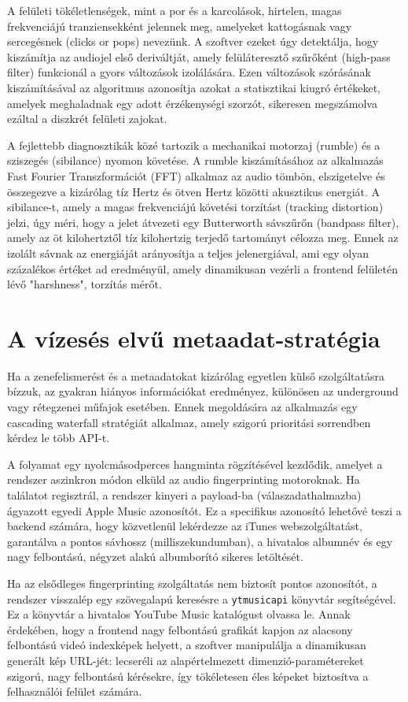 \documentclass[12pt,a4paper,hungarian]{report}
\begin{document}
A felületi tökéletlenségek, mint a por és a karcolások, hirtelen, magas frekvenciájú tranziensekként jelennek meg, amelyeket kattogásnak vagy sercegésnek (clicks or pops) nevezünk. A szoftver ezeket úgy detektálja, hogy kiszámítja az audiojel első deriváltját, amely felüláteresztő szűrőként (high-pass filter) funkcionál a gyors változások izolálására. Ezen változások szórásának kiszámításával az algoritmus azonosítja azokat a statisztikai kiugró értékeket, amelyek meghaladnak egy adott érzékenységi szorzót, sikeresen megszámolva ezáltal a diszkrét felületi zajokat.

A fejlettebb diagnosztikák közé tartozik a mechanikai motorzaj (rumble) és a sziszegés (sibilance) nyomon követése. A rumble kiszámításához az alkalmazás Fast Fourier Transzformációt (FFT) alkalmaz az audio tömbön, elszigetelve és összegezve a kizárólag tíz Hertz és ötven Hertz közötti akusztikus energiát. A sibilance-t, amely a magas frekvenciájú követési torzítást (tracking distortion) jelzi, úgy méri, hogy a jelet átvezeti egy Butterworth sávszűrőn (bandpass filter), amely az öt kilohertztől tíz kilohertzig terjedő tartományt célozza meg. Ennek az izolált sávnak az energiáját arányosítja a teljes jelenergiával, ami egy olyan százalékos értéket ad eredményül, amely dinamikusan vezérli a frontend felületén lévő "harshness", torzítás mérőt.

\section{A vízesés elvű metaadat-stratégia}

Ha a zenefelismerést és a metaadatokat kizárólag egyetlen külső szolgáltatásra bízzuk, az gyakran hiányos információkat eredményez, különösen az underground vagy rétegzenei műfajok esetében. Ennek megoldására az alkalmazás egy cascading waterfall stratégiát alkalmaz, amely szigorú prioritási sorrendben kérdez le több API-t.

A folyamat egy nyolcmásodperces hangminta rögzítésével kezdődik, amelyet a rendszer aszinkron módon elküld az audio fingerprinting motoroknak. Ha találatot regisztrál, a rendszer kinyeri a payload-ba (válaszadathalmazba) ágyazott egyedi Apple Music azonosítót. Ez a specifikus azonosító lehetővé teszi a backend számára, hogy közvetlenül lekérdezze az iTunes webszolgáltatást, garantálva a pontos sávhossz (milliszekundumban), a hivatalos albumnév és egy nagy felbontású, négyzet alakú albumborító sikeres letöltését.

Ha az elsődleges fingerprinting szolgáltatás nem biztosít pontos azonosítót, a rendszer visszalép egy szövegalapú keresésre a \texttt{ytmusicapi} könyvtár segítségével. Ez a könyvtár a hivatalos YouTube Music katalógust olvassa le. Annak érdekében, hogy a frontend nagy felbontású grafikát kapjon az alacsony felbontású videó indexképek helyett, a szoftver manipulálja a dinamikusan generált kép URL-jét: lecseréli az alapértelmezett dimenzió-paramétereket szigorú, nagy felbontású kérésekre, így tökéletesen éles képeket biztosítva a felhasználói felület számára.
\end{document}
